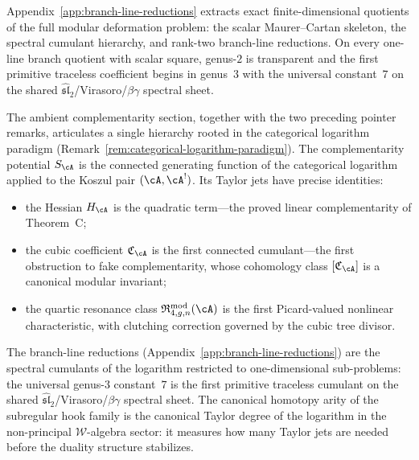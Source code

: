 \begin{remark}
\label{rem:branch-line-pointer}
Appendix~\ref{app:branch-line-reductions} extracts exact
finite-dimensional quotients of the full modular deformation problem: the
scalar Maurer--Cartan skeleton, the spectral cumulant hierarchy, and
rank-two branch-line reductions.  On every one-line branch quotient
with scalar square, genus-$2$ is transparent and the first primitive
traceless coefficient begins in genus~$3$ with the universal
constant~$7$ on the shared
$\widehat{\mathfrak{sl}}_2$/Virasoro/$\beta\gamma$ spectral sheet.
\end{remark}

\begin{remark}
\label{rem:categorical-logarithm-jets}
The ambient complementarity section, together with the two preceding
pointer remarks, articulates a single hierarchy rooted in the
categorical logarithm paradigm
(Remark~\ref{rem:categorical-logarithm-paradigm}).  The
complementarity potential $S_\cA$ is the connected generating
function of the categorical logarithm applied to the Koszul pair
$(\cA,\cA^!)$.  Its Taylor jets have precise identities:
\begin{itemize}
\item the Hessian $H_\cA$ is the quadratic term---the proved linear
  complementarity of Theorem~C;
\item the cubic coefficient $\mathfrak C_\cA$ is the first connected
  cumulant---the first obstruction to fake complementarity, whose
  cohomology class $[\mathfrak C_\cA]$ is a canonical modular
  invariant;
\item the quartic resonance class
  $\mathfrak R_{4,g,n}^{\mathrm{mod}}(\cA)$ is the first
  Picard-valued nonlinear characteristic, with clutching correction
  governed by the cubic tree divisor.
\end{itemize}
The branch-line reductions
(Appendix~\ref{app:branch-line-reductions}) are the spectral
cumulants of the logarithm restricted to one-dimensional
sub-problems: the universal genus-$3$ constant~$7$ is the first
primitive traceless cumulant on the shared
$\widehat{\mathfrak{sl}}_2$/Virasoro/$\beta\gamma$ spectral sheet.
The canonical homotopy arity of the subregular hook family
is the canonical
Taylor degree of the logarithm in the non-principal
$\mathcal W$-algebra sector: it measures how many Taylor jets are
needed before the duality structure stabilizes.
\end{remark}
